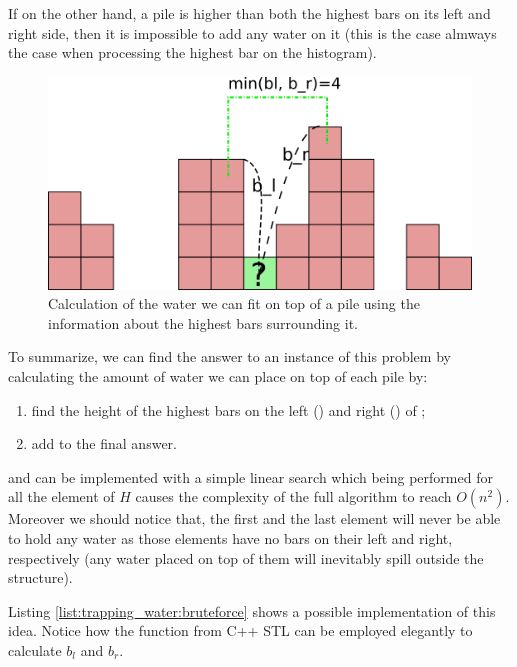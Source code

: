If on the other hand, a pile is higher than both the highest bars on its left and right side, then it is impossible to add any water on it (this is the case almways the case when processing the highest bar on the histogram).


\begin{figure}
	\centering
	\includegraphics[scale=1.0]{sources/trapping_water/images/example3}
	\caption{Calculation of the water we can fit on top of a pile using the information about the highest bars surrounding it.}
	\label{fig:trapping_water_example3}
\end{figure}

To summarize, we can find the answer to an instance of this problem by calculating the amount of water we can place on top of each pile  by:
\begin{enumerate}
	\item find the height of the highest bars on the left () and right () of ;
	\item add  to the final answer. 
\end{enumerate}
 and   can be implemented with a simple linear search which being performed for all the element of $H$ causes the complexity of the full algorithm to reach $O(n^2)$.
Moreover we should notice that, the first and the last element will never be able to hold any water as those elements have no bars on their left and right, respectively (any water placed on top of them will inevitably spill outside the structure).

Listing \ref{list:trapping_water:bruteforce} shows a possible implementation of this idea. 
Notice how the  function from C++ STL can be employed elegantly to calculate $b_l$ and $b_r$.




